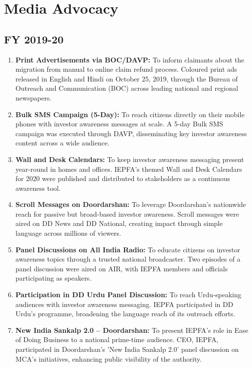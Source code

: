 \documentclass[openany]{book}
\begin{document}
\section{Media Advocacy} \cite{iepfa_annual_reports}

\subsection{FY 2019-20}
\begin{enumerate}
    \item \textbf{Print Advertisements via BOC/DAVP:} To inform claimants about the migration from manual to online claim refund process. Coloured print ads released in English and Hindi on October 25, 2019, through the Bureau of Outreach and Communication (BOC) across leading national and regional newspapers.
    \item \textbf{Bulk SMS Campaign (5-Day):} To reach citizens directly on their mobile phones with investor awareness messages at scale. A 5-day Bulk SMS campaign was executed through DAVP, disseminating key investor awareness content across a wide audience.
    \item \textbf{Wall and Desk Calendars:} To keep investor awareness messaging present year-round in homes and offices. IEPFA's themed Wall and Desk Calendars for 2020 were published and distributed to stakeholders as a continuous awareness tool.
    \item \textbf{Scroll Messages on Doordarshan:} To leverage Doordarshan's nationwide reach for passive but broad-based investor awareness. Scroll messages were aired on DD News and DD National, creating impact through simple language across millions of viewers.
    \item \textbf{Panel Discussions on All India Radio:} To educate citizens on investor awareness topics through a trusted national broadcaster. Two episodes of a panel discussion were aired on AIR, with IEPFA members and officials participating as speakers.
    \item \textbf{Participation in DD Urdu Panel Discussion:} To reach Urdu-speaking audiences with investor awareness messaging. IEPFA participated in DD Urdu's programme, broadening the language reach of its outreach efforts.
    \item \textbf{New India Sankalp 2.0 – Doordarshan:} To present IEPFA's role in Ease of Doing Business to a national prime-time audience. CEO, IEPFA, participated in Doordarshan's 'New India Sankalp 2.0' panel discussion on MCA's initiatives, enhancing public visibility of the authority.

\end{enumerate}
\end{document}
